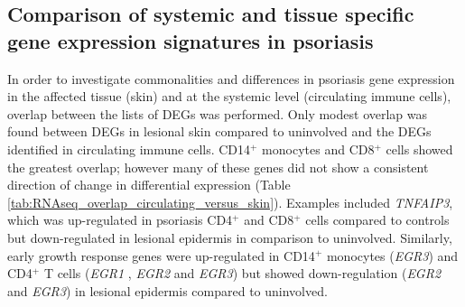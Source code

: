 



\subsection{Comparison of systemic and tissue specific gene expression signatures in psoriasis}

In order to investigate commonalities and differences in psoriasis gene expression in the affected tissue (skin) and at the systemic level (circulating immune cells), overlap between the lists of DEGs was performed. Only modest overlap was found between DEGs in lesional skin compared to uninvolved and the DEGs identified in circulating immune cells. CD14$^+$ monocytes and CD8$^+$ cells showed the greatest overlap; however many of these genes did not show a consistent direction of change in differential expression (Table \ref{tab:RNAseq_overlap_circulating_versus_skin}). Examples included \textit{TNFAIP3}, which was up-regulated in psoriasis CD4$^+$ and CD8$^+$ cells compared to controls but down-regulated in lesional epidermis in comparison to uninvolved. Similarly, early growth response genes were up-regulated in CD14$^+$ monocytes (\textit{EGR3}) and CD4$^+$ T cells (\textit{EGR1} , \textit{EGR2} and \textit{EGR3}) but showed down-regulation (\textit{EGR2} and \textit{EGR3}) in lesional epidermis compared to uninvolved.  

